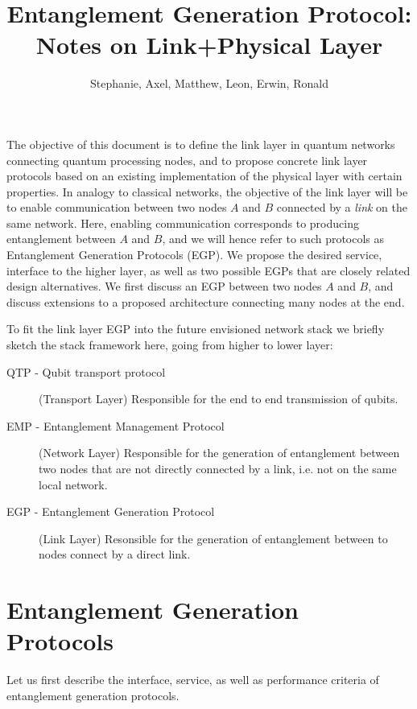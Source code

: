 \documentclass{article}
\begin{document}
\title{Entanglement Generation Protocol: Notes on Link+Physical Layer}
\author{Stephanie, Axel, Matthew, Leon, Erwin, Ronald}
\maketitle

The objective of this document is to define the link layer in quantum networks connecting quantum processing nodes, and to propose concrete link layer protocols
based on an existing implementation of the physical layer with certain properties. In analogy to classical networks, the objective of the link layer will be to enable communication between two nodes $A$ and $B$ connected by a \emph{link} on the same network. Here, enabling communication corresponds to producing entanglement between $A$ and $B$, and we will hence refer to such protocols as Entanglement Generation Protocols (EGP). 
We propose the desired service, interface to the higher layer, as well as two possible EGPs that are closely related design alternatives. We first discuss an EGP between two nodes $A$ and $B$, and discuss extensions
to a proposed architecture connecting many nodes at the end.

To fit the link layer EGP into the future envisioned network stack we briefly sketch the stack framework here, going from higher to lower layer:
\begin{description}
\item[QTP - Qubit transport protocol] (Transport Layer) Responsible for the end to end transmission of qubits. 
\item[EMP - Entanglement Management Protocol] (Network Layer) Responsible for the generation of entanglement between two nodes that are not directly connected by a link, i.e. not on the same local network.
\item[EGP - Entanglement Generation Protocol] (Link Layer) Resonsible for the generation of entanglement between to nodes connect by a direct link. 
\end{description}

\section{Entanglement Generation Protocols}
Let us first describe the interface, service, as well as performance criteria of entanglement generation protocols.
\end{document}
